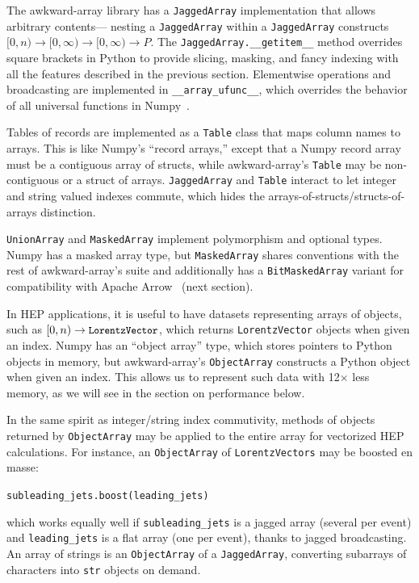 \documentclass{webofc}
\begin{document}
The awkward-array library has a {\tt\small JaggedArray} implementation that allows arbitrary contents--- nesting a {\tt\small JaggedArray} within a {\tt\small JaggedArray} constructs $[0, n) \to [0, \infty) \to [0, \infty) \to P$. The {\tt\small JaggedArray.\_\_getitem\_\_} method overrides square brackets in Python to provide slicing, masking, and fancy indexing with all the features described in the previous section. Elementwise operations and broadcasting are implemented in {\tt\small \_\_array\_ufunc\_\_}, which overrides the behavior of all universal functions in Numpy~\cite{nep13}.

Tables of records are implemented as a {\tt\small Table} class that maps column names to arrays. This is like Numpy's ``record arrays,'' except that a Numpy record array must be a contiguous array of structs, while awkward-array's {\tt\small Table} may be non-contiguous or a struct of arrays. {\tt\small JaggedArray} and {\tt\small Table} interact to let integer and string valued indexes commute, which hides the arrays-of-structs/structs-of-arrays distinction.

{\tt\small UnionArray} and {\tt\small MaskedArray} implement polymorphism and optional types. Numpy has a masked array type, but {\tt\small MaskedArray} shares conventions with the rest of awkward-array's suite and additionally has a {\tt\small BitMaskedArray} variant for compatibility with Apache Arrow~\cite{arrow} (next section).

In HEP applications, it is useful to have datasets representing arrays of objects, such as $[0, n) \to \mbox{\tt\small LorentzVector}$, which returns \mbox{\tt\small LorentzVector} objects when given an index. Numpy has an ``object array'' type, which stores pointers to Python objects in memory, but awkward-array's {\tt\small ObjectArray} constructs a Python object when given an index. This allows us to represent such data with 12$\times$ less memory, as we will see in the section on performance below.

In the same spirit as integer/string index commutivity, methods of objects returned by {\tt\small ObjectArray} may be applied to the entire array for vectorized HEP calculations. For instance, an {\tt\small ObjectArray} of \mbox{\tt\small LorentzVectors} may be boosted en masse:

\begin{center}
\tt\small subleading\_jets.boost(leading\_jets)
\end{center}

\noindent which works equally well if {\tt\small subleading\_jets} is a jagged array (several per event) and {\tt\small leading\_jets} is a flat array (one per event), thanks to jagged broadcasting. An array of strings is an {\tt\small ObjectArray} of a {\tt\small JaggedArray}, converting subarrays of characters into {\tt\small str} objects on demand.
\end{document}
